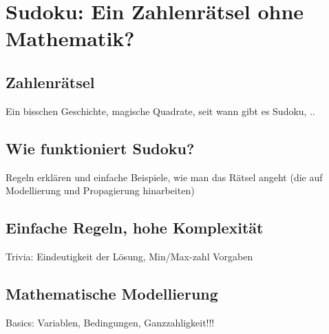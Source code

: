 \chapter{Sudoku: Ein Zahlenrätsel ohne Mathematik?}
\label{chap_sudoku}

\section{Zahlenrätsel}
Ein bisschen Geschichte, magische Quadrate, seit wann gibt es Sudoku, ..

\section{Wie funktioniert Sudoku?}
Regeln erklären und einfache Beispiele, wie man das Rätsel angeht (die
auf Modellierung und Propagierung hinarbeiten)

\section{Einfache Regeln, hohe Komplexität}
Trivia: Eindeutigkeit der Lösung, Min/Max-zahl  Vorgaben

\section{Mathematische Modellierung}
Basics: Variablen, Bedingungen, Ganzzahligkeit!!!

